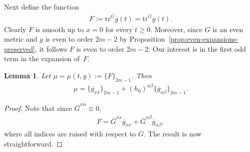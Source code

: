 \documentclass[11pt]{article}
\numberwithin{equation}{section}
\newtheorem{Lemma}[Theorem]{Lemma}
\newcommand{\olg}{\overline{g}}
\newcommand{\olG}{\overline{G}}
\newcommand{\tr}{\mathrm{tr}}
\begin{document}
Next define the function
\begin{gather*}%
F := \tr^{\olG} \olg(t) = \tr^{G} g(t).
\end{gather*}
Clearly $F$ is smooth up to $x=0$ for every $t \geq 0$. Moreover, since $G$ is an even metric and $g$ is even to order $2m-2$ by Proposition~\ref{prop:even-expansions-preserved}, it follows $F$ is even to order $2m-2$. Our interest is in the first odd term in the expansion of~$F$.

\begin{Lemma}\label{lemma3.2} Let $\mu = \mu(t,y) := \{F\}_{2m-1}$. Then
\begin{gather*}%
\mu = \{\olg_{xx}\}_{2m-1} + (h_0)^{\alpha\beta} \{\olg_{\alpha \beta} \}_{2m-1}.
\end{gather*}
\end{Lemma}
\begin{proof}
Note that since $\olG^{x\alpha} \equiv 0$,
\begin{gather*}
\label{eq3.4}
F = \olG^{xx}\olg_{xx} + \olG^{\alpha \beta} \olg_{\alpha \beta},
\end{gather*}
where all indices are raised with respect to $\olG$. The result is now straightforward.
\end{proof}
\end{document}
